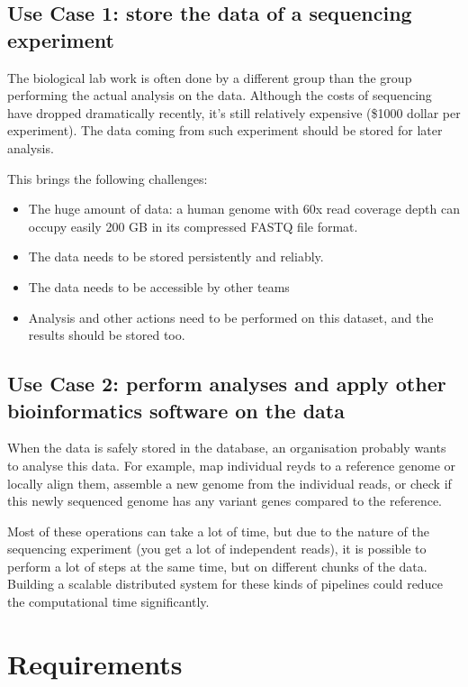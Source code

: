 \documentclass[a4paper,article,oneside]{memoir}
\begin{document}
\section{Use Case 1: store the data of a sequencing experiment}

The biological lab work is often done by a different group than the group performing the actual analysis on the data. Although the costs of sequencing have dropped dramatically recently, it's still relatively expensive (\$1000 dollar per experiment). The data coming from such experiment should be stored for later analysis. 

This brings the following challenges:

\begin{itemize}
    \item The huge amount of data: a human genome with 60x read coverage depth can occupy easily 200 GB in its compressed FASTQ file format.
    \item The data needs to be stored persistently and reliably.
    \item The data needs to be accessible by other teams
    \item Analysis and other actions need to be performed on this dataset, and the results should be stored too.
\end{itemize}

\section{Use Case 2: perform analyses and apply other bioinformatics software on the data}

When the data is safely stored in the database, an organisation probably wants to analyse this data. For example, map individual reyds to a reference genome or locally align them, assemble a new genome from the individual reads, or check if this newly sequenced genome has any variant genes compared to the reference.

Most of these operations can take a lot of time, but due to the nature of the sequencing experiment (you get a lot of independent reads), it is possible to perform a lot of steps at the same time, but on different chunks of the data. Building a scalable distributed system for these kinds of pipelines could reduce the computational time significantly.

\chapter{Requirements}
\end{document}
